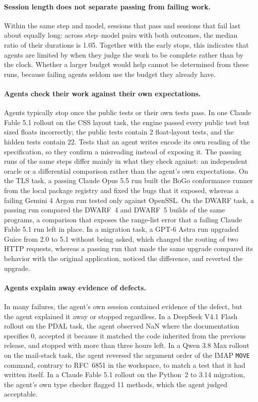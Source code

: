 \documentclass{article}
\begin{document}
\paragraph{Session length does not separate passing from failing work.}
Within the same step and model, sessions that pass and sessions that fail last
about equally long: across step--model pairs with both outcomes, the median
ratio of their durations is 1.05. Together with the early stops, this indicates
that agents are limited by when they judge the work to be complete rather than
by the clock. Whether a larger budget would help cannot be determined from
these runs, because failing agents seldom use the budget they already have.

\paragraph{Agents check their work against their own expectations.}
Agents typically stop once the public tests or their own tests pass. In one
Claude Fable 5.1 rollout on the
CSS layout task, the engine passed every public test but sized floats
incorrectly; the public tests contain 2 float-layout tests, and the hidden
tests contain 22. Tests that an agent writes encode its own reading of the
specification, so they confirm a misreading instead of exposing it. The passing
runs of the same steps differ mainly in what they check against: an
independent oracle or a differential comparison rather than the agent's own
expectations. On the TLS task, a passing Claude Opus 5.5 run built the BoGo
conformance runner from the local package registry and fixed the bugs that it
exposed, whereas a failing Gemini 4 Argon run tested only against OpenSSL. On
the DWARF task, a passing run compared the DWARF~4 and DWARF~5 builds of the
same programs, a comparison that exposes the range-list error that a failing
Claude Fable 5.1 run left in place. In a migration task, a GPT-6 Astra run
upgraded Guice from 2.0 to 5.1 without being asked, which changed the routing
of two HTTP requests, whereas a passing run that made the same upgrade compared
its behavior with the original application, noticed the difference, and
reverted the upgrade.

\paragraph{Agents explain away evidence of defects.}
In many failures, the agent's own session contained evidence of the defect,
but the agent explained it away or stopped regardless. In a DeepSeek V4.1 Flash rollout on the PDAL task, the agent
observed NaN where the documentation specifies 0, accepted it because it
matched the code inherited from the previous release, and stopped with more
than three hours left. In a Qwen 3.8 Max rollout on the mail-stack task, the
agent reversed the argument order of the IMAP \texttt{MOVE} command, contrary to
RFC~6851 in the workspace, to match a test that it had written itself. In a
Claude Fable 5.1 rollout on the Python~2 to 3.14 migration, the agent's own
type checker flagged 11 methods, which the agent judged acceptable.
\end{document}
